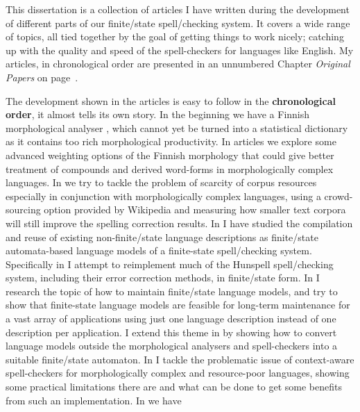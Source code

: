 \documentclass[officiallayout]{unihelcompling}
\begin{document}
This dissertation is a collection of articles I have written during the
development of different parts of our finite\-/state spell\-/checking system. It
covers a wide range of topics, all tied together by the goal of getting things
to work nicely; catching up with the quality and speed of the spell-checkers
for languages like English. My articles, in chronological order are presented
in an unnumbered Chapter \emph{Original Papers} on page~\pageref{chap:papers}.

The development shown in the articles is easy to follow in the
\textbf{chronological order}, it almost tells its own story. In the beginning
we have a Finnish morphological analyser \citep{pirinen2008suomen}, which
cannot yet be turned into a statistical dictionary as it contains too rich
morphological productivity. In articles
 we explore some advanced
weighting options of the Finnish morphology that could give better treatment of
compounds and derived word-forms in morphologically complex languages. In
 we try to tackle the problem of scarcity of
corpus resources especially in conjunction with morphologically complex
languages, using a crowd-sourcing option provided by Wikipedia and measuring
how smaller text corpora will still improve the spelling correction results. In
 I have studied the
compilation and reuse of existing non-finite\-/state language descriptions as
finite\-/state automata-based language models of a finite-state spell\-/checking
system.  Specifically in  I attempt to
reimplement much of the Hunspell spell\-/checking system, including their error
correction methods, in finite\-/state form. In
 I research the topic of how to maintain
finite\-/state language models, and try to show that finite-state language models
are feasible for long-term maintenance for a vast array of applications using
just one language description instead of one description per application.  I
extend this theme in  by showing how to
convert language models outside the morphological analysers and spell-checkers
into a suitable finite\-/state automaton. In  I
tackle the problematic issue of context-aware spell-checkers for
morphologically complex and resource-poor languages, showing some practical
limitations there are and what can be done to get some benefits from such an
implementation. In  we have
\end{document}
